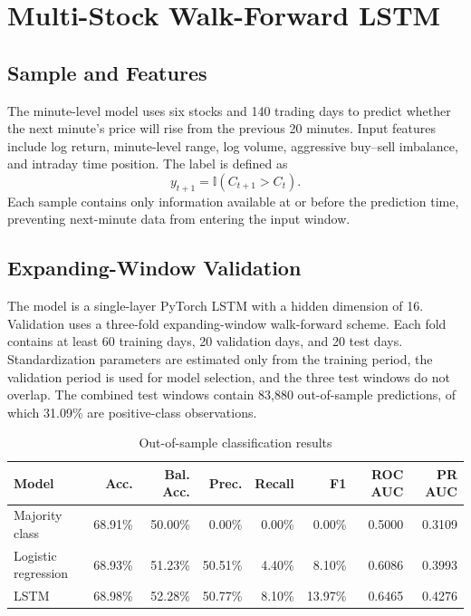 \documentclass[a4paper,11pt,openany]{report}
\begin{document}
\chapter{Multi-Stock Walk-Forward LSTM}

\section{Sample and Features}

The minute-level model uses six stocks and 140 trading days to predict whether the next minute's price will rise from the previous 20 minutes. Input features include log return, minute-level range, log volume, aggressive buy--sell imbalance, and intraday time position. The label is defined as
\begin{equation}
y_{t+1}=\mathbb{I}(C_{t+1}>C_t).
\end{equation}
Each sample contains only information available at or before the prediction time, preventing next-minute data from entering the input window.

\section{Expanding-Window Validation}

The model is a single-layer PyTorch LSTM with a hidden dimension of 16. Validation uses a three-fold expanding-window walk-forward scheme. Each fold contains at least 60 training days, 20 validation days, and 20 test days. Standardization parameters are estimated only from the training period, the validation period is used for model selection, and the three test windows do not overlap. The combined test windows contain 83,880 out-of-sample predictions, of which 31.09\% are positive-class observations.

\begin{table}[H]
\centering
\small
\caption{Out-of-sample classification results}
\begin{tabular}{lrrrrrrr}
\toprule
Model & Acc. & Bal. Acc. & Prec. & Recall & F1 & ROC AUC & PR AUC \\
\midrule
Majority class & 68.91\% & 50.00\% & 0.00\% & 0.00\% & 0.00\% & 0.5000 & 0.3109 \\
Logistic regression & 68.93\% & 51.23\% & 50.51\% & 4.40\% & 8.10\% & 0.6086 & 0.3993 \\
LSTM & 68.98\% & 52.28\% & 50.77\% & 8.10\% & 13.97\% & 0.6465 & 0.4276 \\
\bottomrule
\end{tabular}
\end{table}
\end{document}
